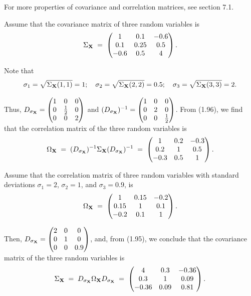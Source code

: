 For more properties of covariance and correlation matrices, see section
7.1.

\begin{examplex}
Assume that the covariance matrix of three random variables is
\[
\Sigma_{\mathbf{X}} \;=\; \begin{pmatrix} 1 & 0.1 & -0.6 \\ 0.1 & 0.25 & 0.5 \\ -0.6 & 0.5 & 4 \end{pmatrix}.
\]

Note that
\[
\sigma_1=\sqrt{\Sigma_{\mathbf{X}}(1,1)}=1; \quad \sigma_2=\sqrt{\Sigma_{\mathbf{X}}(2,2)}=0.5; \quad \sigma_3=\sqrt{\Sigma_{\mathbf{X}}(3,3)}=2.
\]

Thus, $D_{\sigma_{\mathbf{X}}}=\begin{pmatrix} 1 & 0 & 0 \\ 0 & \frac12 & 0 \\ 0 & 0 & 2 \end{pmatrix}$
and $(D_{\sigma_{\mathbf{X}}})^{-1}=\begin{pmatrix} 1 & 0 & 0 \\ 0 & 2 & 0 \\ 0 & 0 & \frac12 \end{pmatrix}$.
From (1.96), we find that the correlation matrix of the three random
variables is
\[
\Omega_{\mathbf{X}} \;=\; (D_{\sigma_{\mathbf{X}}})^{-1}\Sigma_{\mathbf{X}}(D_{\sigma_{\mathbf{X}}})^{-1}
\;=\; \begin{pmatrix} 1 & 0.2 & -0.3 \\ 0.2 & 1 & 0.5 \\ -0.3 & 0.5 & 1 \end{pmatrix}.
\]
\end{examplex}

\begin{examplex}
Assume that the correlation matrix of three random variables with
standard deviations $\sigma_1=2$, $\sigma_2=1$, and $\sigma_3=0.9$, is
\[
\Omega_{\mathbf{X}} \;=\; \begin{pmatrix} 1 & 0.15 & -0.2 \\ 0.15 & 1 & 0.1 \\ -0.2 & 0.1 & 1 \end{pmatrix}.
\]

Then, $D_{\sigma_{\mathbf{X}}}=\begin{pmatrix} 2 & 0 & 0 \\ 0 & 1 & 0 \\ 0 & 0 & 0.9 \end{pmatrix}$,
and, from (1.95), we conclude that the covariance matrix of the three
random variables is
\[
\Sigma_{\mathbf{X}} \;=\; D_{\sigma_{\mathbf{X}}}\Omega_{\mathbf{X}}D_{\sigma_{\mathbf{X}}}
\;=\; \begin{pmatrix} 4 & 0.3 & -0.36 \\ 0.3 & 1 & 0.09 \\ -0.36 & 0.09 & 0.81 \end{pmatrix}.
\]
\end{examplex}

